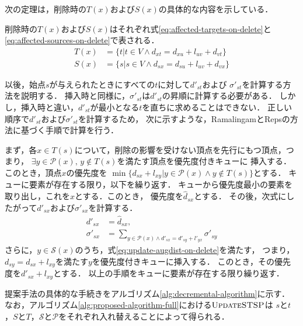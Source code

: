 次の定理は，削除時の$T(x)$および$S(x)$の具体的な内容を示している．
\begin{theorem}
  \label{thm:affected-vertices-on-delete}
  削除時の$T(x)$および$S(x)$はそれぞれ式\eqref{eq:affected-targets-on-delete}と
  \eqref{eq:affected-sources-on-delete}で表される．
  \begin{align}
    T(x)&=\{t|t\in V\land d_{xt}=d_{xu}+l_{uv}+d_{vt}\}
    \label{eq:affected-targets-on-delete} \\
    S(x)&=\{s|s\in V\land d_{sx}=d_{su}+l_{uv}+d_{vx}\}
    \label{eq:affected-sources-on-delete}
  \end{align}
\end{theorem}

以後，始点$s$が与えられたときにすべての$t$に対して$d'_{st}$および
$\sigma'_{st}$を計算する方法を説明する．
挿入時と同様に，$\sigma'_{st}$は$d'_{st}$の昇順に計算する必要がある．
しかし，挿入時と違い，$d'_{st}$が最小となる$t$を直ちに求めることはできない．
正しい順序で$d'_{st}$および$\sigma'_{st}$を計算するため，
次に示すような，RamalingamとRepsの方法に基づく手順で計算を行う．

まず，各$x\in T(s)$について，削除の影響を受けない頂点を先行にもつ頂点，つまり，
$\exists y\in\mathcal{P}(x),\,y\notin T(s)$を満たす頂点を優先度付きキューに
挿入する．このとき，頂点$x$の優先度を
$\min\{d_{sx}+l_{xy}|y\in\mathcal{P}(x)\land y\notin T(s)\}$とする．
キューに要素が存在する限り，以下を繰り返す．
キューから優先度最小の要素を取り出し，これを$x$とする．このとき，
優先度を$\hat{d}_{sx}$とする．
その後，次式にしたがって$d'_{sx}$および$\sigma'_{sx}$を計算する．
\begin{equation*}
  \begin{aligned}
    d'_{sx}&=\hat{d}_{sx},\\
    \sigma'_{sx}&=\sum_{y\in\mathcal{P}(x)\land d'_{sx}=d'_{sy}+l'_{yx}}\sigma'_{sy}
  \end{aligned}
\end{equation*}
さらに，$y\in\mathcal{S}(x)$のうち，式\eqref{eq:update-augdist-on-delete}を満たす，
つまり，$d_{sy}=d_{sx}+l_{xy}$を満たす$y$を優先度付きキューに挿入する．
このとき，その優先度を$d'_{sx}+l_{xy}$とする．
以上の手順をキューに要素が存在する限り繰り返す．

提案手法の具体的な手続きをアルゴリズム\ref{alg:decremental-algorithm}に示す．
なお，アルゴリズム\ref{alg:proposed-algorithm-full}における$\textproc{UpdateSTSP}$は
$s$と$t$，$S$と$T$，$\mathcal{S}$と$\mathcal{P}$をそれぞれ入れ替えることによって得られる．

